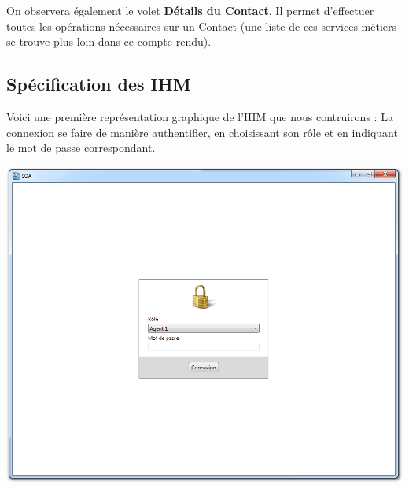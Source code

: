 On observera également le volet \textbf{Détails du Contact}. Il permet d'effectuer toutes les
opérations nécessaires sur un Contact (une liste de ces services métiers se trouve plus loin
dans ce compte rendu).


\subsection{Spécification des IHM}
Voici une première représentation graphique de l'IHM que nous contruirons :
La connexion se faire de manière authentifier, en choisissant son rôle et en indiquant le mot de passe correspondant.
\medskip
\begin {center}
\includegraphics[width=\textwidth]{../../ihm/pngIHM/login.png}
\end {center}
\medskip

